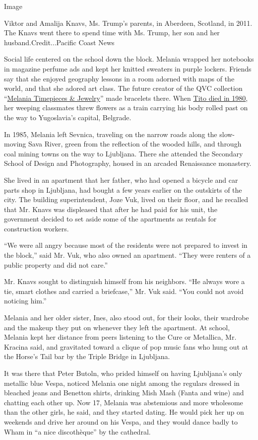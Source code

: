 Image

Viktor and Amalija Knavs, Ms. Trump's parents, in Aberdeen, Scotland, in
2011. The Knavs went there to spend time with Ms. Trump, her son and her
husband.Credit...Pacific Coast News

Social life centered on the school down the block. Melania wrapped her
notebooks in magazine perfume ads and kept her knitted sweaters in
purple lockers. Friends say that she enjoyed geography lessons in a room
adorned with maps of the world, and that she adored art class. The
future creator of the QVC collection
``\href{https://www.youtube.com/watch?v=ID0KKalefqw}{Melania Timepieces
\& Jewelry}'' made bracelets there. When
\href{http://nyti.ms/29OUbBu}{Tito died in 1980}, her weeping classmates
threw flowers as a train carrying his body rolled past on the way to
Yugoslavia's capital, Belgrade.

In 1985, Melania left Sevnica, traveling on the narrow roads along the
slow-moving Sava River, green from the reflection of the wooded hills,
and through coal mining towns on the way to Ljubljana. There she
attended the Secondary School of Design and Photography, housed in an
arcaded Renaissance monastery.

She lived in an apartment that her father, who had opened a bicycle and
car parts shop in Ljubljana, had bought a few years earlier on the
outskirts of the city. The building superintendent, Joze Vuk, lived on
their floor, and he recalled that Mr. Knavs was displeased that after he
had paid for his unit, the government decided to set aside some of the
apartments as rentals for construction workers.

``We were all angry because most of the residents were not prepared to
invest in the block,'' said Mr. Vuk, who also owned an apartment. ``They
were renters of a public property and did not care.''

Mr. Knavs sought to distinguish himself from his neighbors. ``He always
wore a tie, smart clothes and carried a briefcase,'' Mr. Vuk said. ``You
could not avoid noticing him.''

Melania and her older sister, Ines, also stood out, for their looks,
their wardrobe and the makeup they put on whenever they left the
apartment. At school, Melania kept her distance from peers listening to
the Cure or Metallica, Mr. Kracina said, and gravitated toward a clique
of pop music fans who hung out at the Horse's Tail bar by the Triple
Bridge in Ljubljana.

It was there that Peter Butoln, who prided himself on having Ljubljana's
only metallic blue Vespa, noticed Melania one night among the regulars
dressed in bleached jeans and Benetton shirts, drinking Mish Mash (Fanta
and wine) and chatting each other up. Now 17, Melania was abstemious and
more wholesome than the other girls, he said, and they started dating.
He would pick her up on weekends and drive her around on his Vespa, and
they would dance badly to Wham in ``a nice discothèque'' by the
cathedral.

